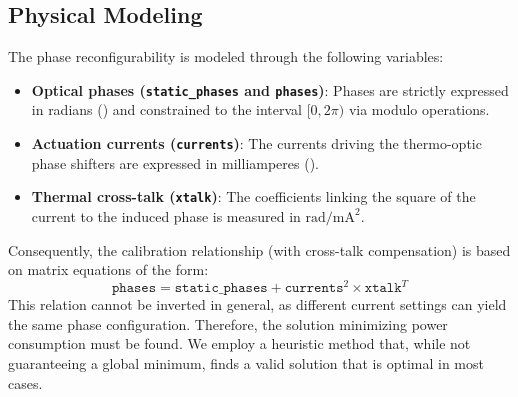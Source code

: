 \documentclass[11pt, a4paper]{article}
\begin{document}
\subsection{Physical Modeling}
The phase reconfigurability is modeled through the following variables:
\begin{itemize}
    \item \textbf{Optical phases (\texttt{static\_phases} and \texttt{phases})}: Phases are strictly expressed in radians () and constrained to the interval $[0, 2\pi)$ via modulo operations.
    \item \textbf{Actuation currents (\texttt{currents})}: The currents driving the thermo-optic phase shifters are expressed in milliamperes ().
    \item \textbf{Thermal cross-talk (\texttt{xtalk})}: The coefficients linking the square of the current to the induced phase is measured in $\text{rad}/\text{mA}^2$. 
\end{itemize}
Consequently, the calibration relationship (with cross-talk compensation) is based on matrix equations of the form:
\begin{equation}
    \texttt{phases} = \texttt{static\_phases} + \texttt{currents}^2 \times \texttt{xtalk}^T
\end{equation}
This relation cannot be inverted in general, as different current settings can yield the same phase configuration. Therefore, the solution minimizing power consumption must be found. We employ a heuristic method that, while not guaranteeing a global minimum, finds a valid solution that is optimal in most cases.
    
\end{document}
